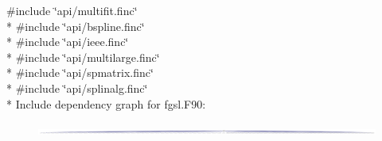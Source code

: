 {\ttfamily \#include \char`\"{}api/multifit.\+finc\char`\"{}}\\*
{\ttfamily \#include \char`\"{}api/bspline.\+finc\char`\"{}}\\*
{\ttfamily \#include \char`\"{}api/ieee.\+finc\char`\"{}}\\*
{\ttfamily \#include \char`\"{}api/multilarge.\+finc\char`\"{}}\\*
{\ttfamily \#include \char`\"{}api/spmatrix.\+finc\char`\"{}}\\*
{\ttfamily \#include \char`\"{}api/splinalg.\+finc\char`\"{}}\\*
Include dependency graph for fgsl.\+F90\+:
\nopagebreak
\begin{figure}[H]
\begin{center}
\leavevmode
\includegraphics[width=350pt]{fgsl_8F90__incl}
\end{center}
\end{figure}
